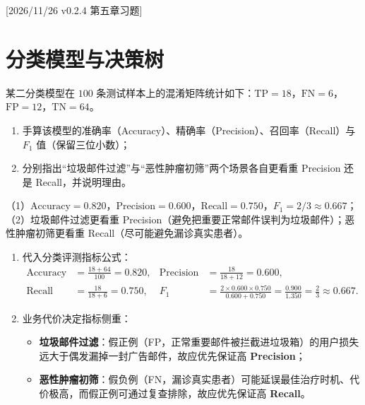 %
%
[2026/11/26 v0.2.4 第五章习题]
\section{分类模型与决策树}

\begin{exercise}[title={混淆矩阵手算与业务指标权衡},level=basic,points=10,tags={混淆矩阵,Precision,Recall,F1}]
某二分类模型在 $100$ 条测试样本上的混淆矩阵统计如下：$\mathrm{TP}=18$，$\mathrm{FN}=6$，$\mathrm{FP}=12$，$\mathrm{TN}=64$。
\begin{enumerate}
  \item 手算该模型的准确率（Accuracy）、精确率（Precision）、召回率（Recall）与 $F_1$ 值（保留三位小数）；
  \item 分别指出“垃圾邮件过滤”与“恶性肿瘤初筛”两个场景各自更看重 Precision 还是 Recall，并说明理由。
\end{enumerate}
\begin{answer}
（1）$\mathrm{Accuracy}=0.820$，$\mathrm{Precision}=0.600$，$\mathrm{Recall}=0.750$，$F_1 = 2/3 \approx 0.667$；（2）垃圾邮件过滤更看重 Precision（避免把重要正常邮件误判为垃圾邮件）；恶性肿瘤初筛更看重 Recall（尽可能避免漏诊真实患者）。
\end{answer}
\begin{solution}
\begin{enumerate}
  \item 代入分类评测指标公式：
  \[\begin{aligned}
    \mathrm{Accuracy} &= \frac{18 + 64}{100} = 0.820, &
    \mathrm{Precision} &= \frac{18}{18 + 12} = 0.600, \\
    \mathrm{Recall} &= \frac{18}{18 + 6} = 0.750, &
    F_1 &= \frac{2 \times 0.600 \times 0.750}{0.600 + 0.750} = \frac{0.900}{1.350} = \frac{2}{3} \approx 0.667.
  \end{aligned}\]
  \item 业务代价决定指标侧重：
  \begin{itemize}
    \item \textbf{垃圾邮件过滤}：假正例（FP，正常重要邮件被拦截进垃圾箱）的用户损失远大于偶发漏掉一封广告邮件，故应优先保证高 \textbf{Precision}；
    \item \textbf{恶性肿瘤初筛}：假负例（FN，漏诊真实患者）可能延误最佳治疗时机、代价极高，而假正例可通过复查排除，故应优先保证高 \textbf{Recall}。
  \end{itemize}
\end{enumerate}
\end{solution}
\end{exercise}

